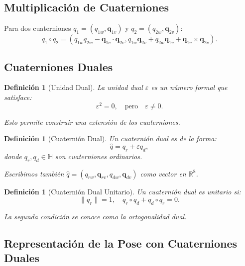 \documentclass[11pt,a4paper]{article}
\newtheorem{definition}[theorem]{Definición}
\begin{document}
\subsection{Multiplicación de Cuaterniones}

Para dos cuaterniones $q_1 = (q_{1w}, \mathbf{q}_{1v})$ y $q_2 = (q_{2w}, \mathbf{q}_{2v})$:
\begin{equation}
    q_1 \circ q_2 = (q_{1w}q_{2w} - \mathbf{q}_{1v} \cdot \mathbf{q}_{2v}, q_{1w}\mathbf{q}_{2v} + q_{2w}\mathbf{q}_{1v} + \mathbf{q}_{1v} \times \mathbf{q}_{2v}).
\end{equation}

\subsection{Cuaterniones Duales}

\begin{definition}[Unidad Dual]
La \emph{unidad dual} $\varepsilon$ es un número formal que satisface:
\begin{equation}
    \varepsilon^2 = 0, \quad \text{pero} \quad \varepsilon \neq 0.
\end{equation}

Esto permite construir una extensión de los cuaterniones.
\end{definition}

\begin{definition}[Cuaternión Dual]
Un \emph{cuaternión dual} es de la forma:
\begin{equation}
    \hat{q} = q_r + \varepsilon q_d,
\end{equation}
donde $q_r, q_d \in \mathbb{H}$ son cuaterniones ordinarios.

Escribimos también $\hat{q} = (q_{rw}, \mathbf{q}_{rv}, q_{dw}, \mathbf{q}_{dv})$ como vector en $\mathbb{R}^8$.
\end{definition}

\begin{definition}[Cuaternión Dual Unitario]
Un cuaternión dual es \emph{unitario} si:
\begin{equation}
    \|q_r\| = 1, \quad q_r \circ q_d + q_d \circ q_r = 0.
\end{equation}

La segunda condición se conoce como la \emph{ortogonalidad dual}.
\end{definition}

\subsection{Representación de la Pose con Cuaterniones Duales}
\end{document}
